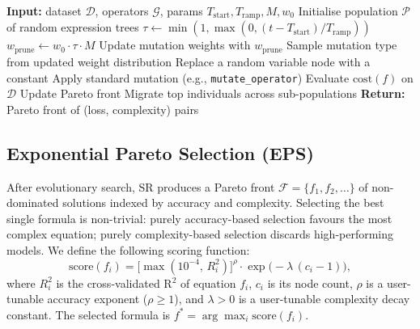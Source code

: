 \documentclass[10pt,twocolumn]{article}
\begin{document}
\begin{algorithm}
\caption{Evolutionary SR with Dynamic Variable Pruning Schedule}
\label{alg:dvps}
\begin{algorithmic}[1]
\State \textbf{Input:} dataset $\mathcal{D}$, operators $\mathcal{G}$,
       params $T_{\mathrm{start}}, T_{\mathrm{ramp}}, M, w_0$
\State Initialise population $\mathcal{P}$ of random expression trees
  \State $\tau \gets \min(1, \max(0, (t - T_{\mathrm{start}})/T_{\mathrm{ramp}}))$
  \State $w_{\mathrm{prune}} \gets w_0 \cdot \tau \cdot M$
  \State Update mutation weights with $w_{\mathrm{prune}}$
    \State Sample mutation type from updated weight distribution
      \State Replace a random variable node with a constant
    \Else
      \State Apply standard mutation (e.g., \texttt{mutate\_operator})
    \EndIf
    \State Evaluate $\mathrm{cost}(f)$ on $\mathcal{D}$
    \State Update Pareto front
  \EndFor
  \State Migrate top individuals across sub-populations
\EndFor
\State \textbf{Return:} Pareto front of (loss, complexity) pairs
\end{algorithmic}
\end{algorithm}

\subsection{Exponential Pareto Selection (EPS)}
\label{sec:eps}

After evolutionary search, SR produces a Pareto front $\mathcal{F} =
\{f_1, f_2, \ldots\}$ of non-dominated solutions indexed by accuracy and
complexity.  Selecting the best single formula is non-trivial: purely
accuracy-based selection favours the most complex equation; purely
complexity-based selection discards high-performing models.  We define the
following scoring function:
\begin{equation}
  \mathrm{score}(f_i) =
    \bigl[\max(10^{-4},\, R^2_i)\bigr]^{\rho}
    \cdot \exp\!\bigl(-\lambda\,(c_i - 1)\bigr),
  \label{eq:eps}
\end{equation}
where $R^2_i$ is the cross-validated R$^2$ of equation $f_i$, $c_i$ is its
node count, $\rho$ is a user-tunable accuracy exponent ($\rho \geq 1$), and
$\lambda > 0$ is a user-tunable complexity decay constant.  The selected
formula is $f^* = \arg\max_i \mathrm{score}(f_i)$.
\end{document}
